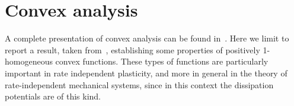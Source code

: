 \documentclass[a4paper,10pt,oneside]{amsbook}
\numberwithin{section}{chapter}
\numberwithin{equation}{chapter}
\theoremstyle{definition}
\newtheorem{ex}[prop]{Example}
\DeclarePairedDelimiter{\norm}{\lVert}{\rVert}
\DeclarePairedDelimiter{\dual}{\langle}{\rangle}
\begin{document}
\section{Convex analysis}

A complete presentation of convex analysis can be found in~\cite{ekeland-temam}. Here we limit to report a result, taken from~\cite{rate-independent-systems}, establishing some properties of positively 1-homogeneous convex functions. These types of functions are particularly important in rate independent plasticity, and more in general in the theory of rate-independent mechanical systems, since in this context the dissipation potentials are of this kind.
\end{document}
